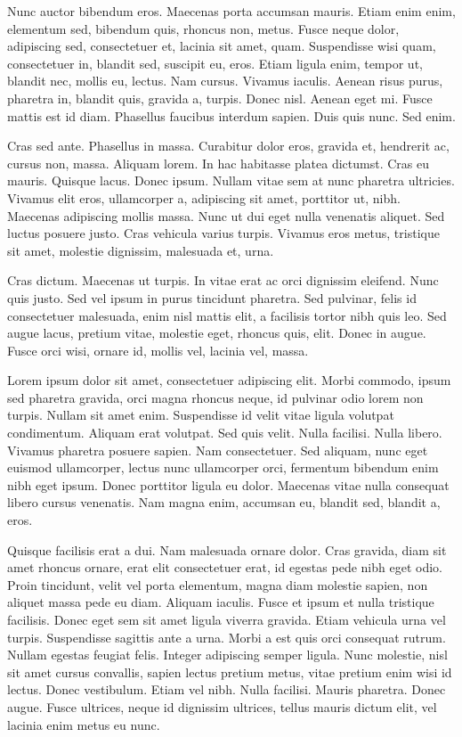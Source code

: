 Nunc auctor bibendum eros. Maecenas porta accumsan mauris. Etiam enim enim,
elementum sed, bibendum quis, rhoncus non, metus. Fusce neque dolor, adipiscing
sed, consectetuer et, lacinia sit amet, quam. Suspendisse wisi quam,
consectetuer in, blandit sed, suscipit eu, eros. Etiam ligula enim, tempor ut,
blandit nec, mollis eu, lectus. Nam cursus. Vivamus iaculis. Aenean risus
purus, pharetra in, blandit quis, gravida a, turpis. Donec nisl. Aenean eget
mi. Fusce mattis est id diam. Phasellus faucibus interdum sapien. Duis quis
nunc. Sed enim.


Cras sed ante. Phasellus in massa. Curabitur dolor eros, gravida et, hendrerit
ac, cursus non, massa. Aliquam lorem. In hac habitasse platea dictumst. Cras eu
mauris. Quisque lacus. Donec ipsum. Nullam vitae sem at nunc pharetra
ultricies. Vivamus elit eros, ullamcorper a, adipiscing sit amet, porttitor ut,
nibh. Maecenas adipiscing mollis massa. Nunc ut dui eget nulla venenatis
aliquet. Sed luctus posuere justo. Cras vehicula varius turpis. Vivamus eros
metus, tristique sit amet, molestie dignissim, malesuada et, urna.

Cras dictum. Maecenas ut turpis. In vitae erat ac orci dignissim eleifend. Nunc
quis justo. Sed vel ipsum in purus tincidunt pharetra. Sed pulvinar, felis id
consectetuer malesuada, enim nisl mattis elit, a facilisis tortor nibh quis
leo. Sed augue lacus, pretium vitae, molestie eget, rhoncus quis, elit. Donec
in augue. Fusce orci wisi, ornare id, mollis vel, lacinia vel, massa.

Lorem ipsum dolor sit amet, consectetuer adipiscing elit. Morbi commodo, ipsum
sed pharetra gravida, orci magna rhoncus neque, id pulvinar odio lorem non
turpis. Nullam sit amet enim. Suspendisse id velit vitae ligula volutpat
condimentum. Aliquam erat volutpat. Sed quis velit. Nulla facilisi. Nulla
libero. Vivamus pharetra posuere sapien. Nam consectetuer. Sed aliquam, nunc
eget euismod ullamcorper, lectus nunc ullamcorper orci, fermentum bibendum enim
nibh eget ipsum. Donec porttitor ligula eu dolor. Maecenas vitae nulla
consequat libero cursus venenatis. Nam magna enim, accumsan eu, blandit sed,
blandit a, eros.

Quisque facilisis erat a dui. Nam malesuada ornare dolor. Cras gravida, diam
sit amet rhoncus ornare, erat elit consectetuer erat, id egestas pede nibh eget
odio. Proin tincidunt, velit vel porta elementum, magna diam molestie sapien,
non aliquet massa pede eu diam. Aliquam iaculis. Fusce et ipsum et nulla
tristique facilisis. Donec eget sem sit amet ligula viverra gravida. Etiam
vehicula urna vel turpis. Suspendisse sagittis ante a urna. Morbi a est quis
orci consequat rutrum. Nullam egestas feugiat felis. Integer adipiscing semper
ligula. Nunc molestie, nisl sit amet cursus convallis, sapien lectus pretium
metus, vitae pretium enim wisi id lectus. Donec vestibulum. Etiam vel nibh.
Nulla facilisi. Mauris pharetra. Donec augue. Fusce ultrices, neque id
dignissim ultrices, tellus mauris dictum elit, vel lacinia enim metus eu nunc.

